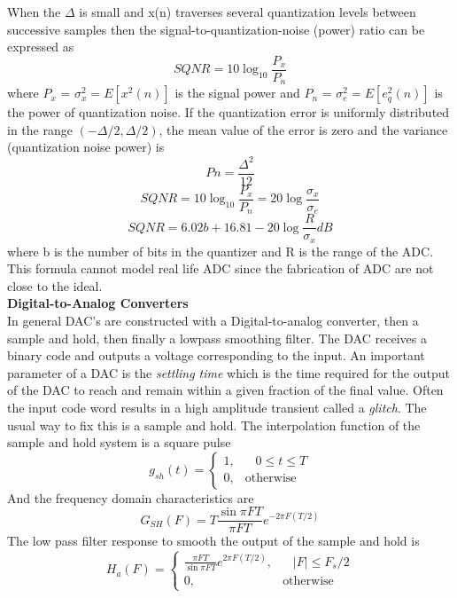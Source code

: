 \documentclass{article} %
\begin{document}
	When the $\Delta$ is small and x(n) traverses several quantization levels between successive samples then the signal-to-quantization-noise (power) ratio can be expressed as
	\begin{equation}
	SQNR = 10\log_{10} \frac{P_x}{P_n}
	\end{equation}
	where $P_x$ = $\sigma_x^2 = E[x^2(n)]$ is the signal power and $P_n$ = $\sigma_e^2 = E[e_q^2(n)]$ is the power of quantization noise. If the quantization error is uniformly distributed in the range $(-\Delta /2, \Delta /2)$, the mean value of the error is zero and the variance (quantization noise power) is
	\begin{equation}
	Pn = \frac{\Delta^2}{12}
	\end{equation}
	\begin{equation}
	SQNR = 10\log_{10} \frac{P_x}{P_n} = 20 \log \frac{\sigma_x}{\sigma_e}
	\end{equation}
	\begin{equation}
	SQNR = 6.02b + 16.81 - 20 \log \frac{R}{\sigma_x}dB
	\end{equation}
	where b is the number of bits in the quantizer and R is the range of the ADC. This formula cannot model real life ADC since the fabrication of ADC are not close to the ideal.\\
	\textbf{Digital-to-Analog Converters}\\
	
	In general DAC's are constructed with a Digital-to-analog converter, then a sample and hold, then finally a lowpass smoothing filter. The DAC receives a binary code and outputs a voltage corresponding to the input. An important parameter of a DAC is the \textit{settling time} which is the time required for the output of the DAC to reach and remain within a given fraction of the final value. Often the input code word results in a high amplitude transient called a \textit{glitch}. The usual way to fix this is a sample and hold. The interpolation function of the sample and hold system is a square pulse
	\begin{equation}
	g_{sh}(t) = 
		\begin{cases}
      		1, & \;\;\; 0 \le t \le T \\
      		0, & \text{otherwise}
    	\end{cases} 
	\end{equation}
	And the frequency domain characteristics are
	\begin{equation}
	G_{SH}(F) = T \frac{\sin \pi FT}{\pi FT}e^{-2\pi F(T/2)}
	\end{equation}
	The low pass filter response to smooth the output of the sample and hold is
	\begin{equation}
	H_a(F) = \begin{cases}
      		\frac{\pi FT}{\sin \pi FT}e^{2\pi F(T/2)}, & \;\;\; |F| \le F_s/2 \\
      		0, & \text{otherwise}
    	\end{cases} 
	\end{equation}
\end{document}
